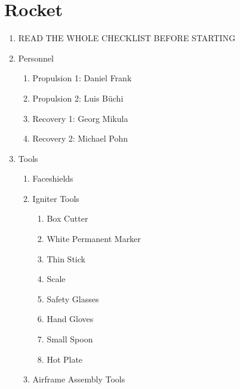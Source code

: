 \newpage
\setcounter{page}{1}
\lfoot{\thepage / \pageref{end_section_rocket}}
\section*{Rocket}
%


\begin{enumerate}[label=R\arabic*.]

    \item READ THE WHOLE CHECKLIST BEFORE STARTING \checkbox
    
    \item \label{rocket_personnel} Personnel
        \begin{enumerate}[label*=\arabic*.]
            \item Propulsion 1: Daniel Frank
            \item Propulsion 2: Luis Büchi
            \item Recovery 1: Georg Mikula
            \item Recovery 2: Michael Pohn
        \end{enumerate}
    \item \label{rocket_tools} Tools
        \begin{enumerate}[label*=\arabic*.]
            \item Faceshields\leftcheckbox
            \item Igniter Tools\leftcheckbox
            \begin{enumerate}[label*=\arabic*.]
                \item Box Cutter\leftcheckbox
                \item White Permanent Marker\leftcheckbox
                \item Thin Stick\leftcheckbox
                \item Scale\leftcheckbox
                \item Safety Glasses\leftcheckbox
                \item Hand Gloves\leftcheckbox
                \item Small Spoon\leftcheckbox
                \item Hot Plate\leftcheckbox
            \end{enumerate}
            \item Airframe Assembly Tools\leftcheckbox
            \begin{enumerate}[label*=\arabic*.]

\end{enumerate}
\end{enumerate}
\end{enumerate}
